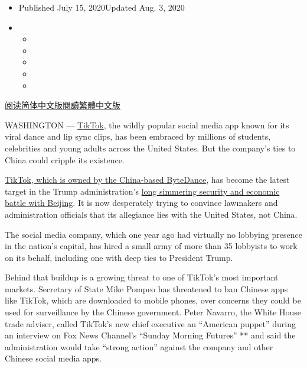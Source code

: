 \begin{itemize}
\item
  Published July 15, 2020Updated Aug. 3, 2020
\item
  \begin{itemize}
  \item
  \item
  \item
  \item
  \item
  \end{itemize}
\end{itemize}

\href{https://cn.nytimes.com/technology/20200716/tiktok-washington-lobbyist/}{阅读简体中文版}\href{https://cn.nytimes.com/technology/20200716/tiktok-washington-lobbyist/zh-hant/}{閱讀繁體中文版}

WASHINGTON ---
\href{https://www.nytimes.com/2020/08/01/technology/tiktok-trump-microsoft-bytedance-china-ban.html}{TikTok},
the wildly popular social media app known for its viral dance and lip
sync clips, has been embraced by millions of students, celebrities and
young adults across the United States. But the company's ties to China
could cripple its existence.

\href{https://www.nytimes.com/2020/08/03/technology/tiktok-trump-sale-microsoft.html}{TikTok,
which is owned by the China-based ByteDance}, has become the latest
target in the Trump administration's
\href{https://www.nytimes.com/2020/01/20/business/economy/trump-us-china-deal-micron-trade-war.html}{long
simmering security and economic battle with Beijing}. It is now
desperately trying to convince lawmakers and administration officials
that its allegiance lies with the United States, not China.

The social media company, which one year ago had virtually no lobbying
presence in the nation's capital, has hired a small army of more than 35
lobbyists to work on its behalf, including one with deep ties to
President Trump.

Behind that buildup is a growing threat to one of TikTok's most
important markets. Secretary of State Mike Pompeo has threatened to ban
Chinese apps like TikTok, which are downloaded to mobile phones, over
concerns they could be used for surveillance by the Chinese government.
Peter Navarro, the White House trade adviser, called TikTok's new chief
executive an ``American puppet'' during an interview on Fox News
Channel's ``Sunday Morning Futures'' ** and said the administration
would take ``strong action'' against the company and other Chinese
social media apps.

